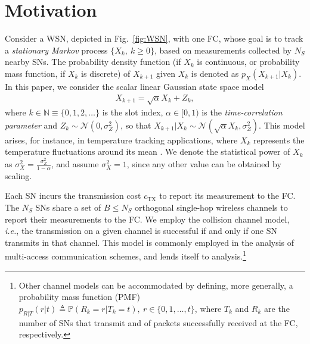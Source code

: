 \documentclass[10pt,twocolumn,twoside]{IEEEtran}
\theoremstyle{plain}
\begin{document}
\section{Motivation}
\label{probform}
 Consider a WSN, depicted in Fig.~\ref{fig:WSN}, with one FC, whose goal
 is to track a \emph{stationary Markov} process $\{X_k,\ k\geq 0\}$,
 based on measurements collected  by $N_S$ nearby SNs.
 The probability density function (if $X_k$ is continuous, or probability mass function, if $X_k$ is discrete) of $X_{k+1}$ given $X_k$ is denoted as 
 $p_{X}(X_{k+1}|X_k)$. In this paper, we consider the  scalar linear Gaussian state space model
\begin{align}
\label{markovstate}
X_{k+1}=\sqrt{\alpha}X_k+Z_k,
\end{align}
where $k\in\mathbb N\equiv\{0,1,2,\dots\}$ is the slot index,
 $\alpha\in [0,1)$ is the \emph{time-correlation parameter}  and $Z_k\sim\mathcal N(0,\sigma_Z^2)$,
 so that $X_{k+1}|X_k\sim\mathcal N(\sqrt{\alpha} X_k,\sigma_Z^2)$.
 This model arises, for instance, in temperature tracking applications, where $X_k$ represents the temperature fluctuations around its mean \cite{Tandeo}.
 We denote the statistical power of $X_k$ as $\sigma_X^2=\frac{\sigma_Z^2}{1-\alpha}$,
 and assume  $\sigma_X^2=1$, since any other value can be obtained by scaling.
 
Each SN incurs the transmission cost $c_{\mathrm{TX}}$ to report its measurement to the FC.
   The $N_S$ SNs share 
 a set of $B{\leq}N_S$ orthogonal single-hop wireless channels to report their measurements to the FC.
 We employ the collision channel model, \emph{i.e.},
 the transmission on a given channel is successful if and only if one SN transmits in that channel. 
 This model is commonly employed in the analysis of multi-access communication schemes,
and lends itself to analysis.\footnote{Other channel models can be accommodated by defining, more generally, a probability mass function (PMF) $
 p_{R|T}(r|t)\triangleq\mathbb P(R_k=r|T_k=t),\ r\in\{0,1,\dots,t\}$, where
 $T_k$ and $R_k$ are the number of SNs that transmit and of packets successfully received at the FC, respectively.}
 
\end{document}
